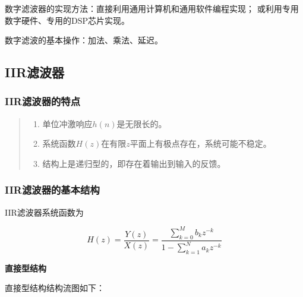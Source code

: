 \documentclass[cn, hazy, blue, normal, 14pt]{elegantnote}
\begin{document}
数字滤波器的实现方法：直接利用通用计算机和通用软件编程实现；
或利用专用数字硬件、专用的DSP芯片实现。

数字滤波的基本操作：加法、乘法、延迟。

\subsection{IIR滤波器}

\subsubsection{IIR滤波器的特点}

\begin{quote}
\begin{enumerate}
    \item 单位冲激响应$h(n)$是无限长的。
    \item 系统函数$H(z)$在有限$z$平面上有极点存在，系统可能不稳定。
    \item 结构上是递归型的，即存在着输出到输入的反馈。
\end{enumerate}
\end{quote}

\subsubsection{IIR滤波器的基本结构}

IIR滤波器系统函数为

\begin{equation}
    H(z)=\frac{Y(z)}{X(z)}=\frac{\sum\limits_{k=0}^{M}b_k z^{-k}}{1-\sum\limits_{k=1}^{N}a_k z^{-k}}
\end{equation}

\textbf{直接\uppercase\expandafter{}型结构}

直接\uppercase\expandafter{}型结构结构流图如下：
\end{document}

